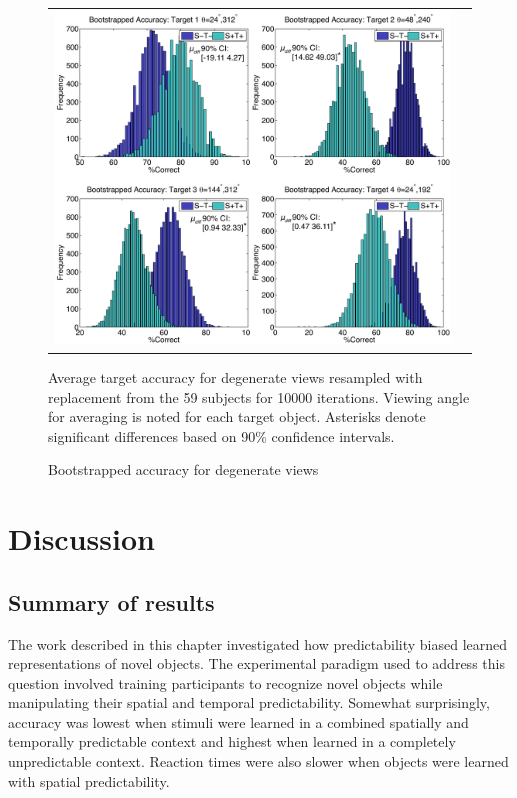 \documentclass[dwyatte_dissertation.tex]{subfiles}
\begin{document}
\begin{figure}[h!]
\begin{center}
\begin{tabular}{ll}
\includegraphics[width=160mm]{figs/chap_bpleast/results_bootstrap_montage.pdf}
\end{tabular}
\end{center}
\caption{Bootstrapped accuracy for degenerate views}{Average target accuracy for degenerate views resampled with replacement from the 59 subjects for 10000 iterations. Viewing angle for averaging is noted for each target object. Asterisks denote significant differences based on 90\% confidence intervals.}
\label{fig:bpleast_behave_bootstrap}
\end{figure}

\section{Discussion}\subsection{Summary of results}
The work described in this chapter investigated how predictability biased learned representations of novel objects. The experimental paradigm used to address this question involved training participants to recognize novel objects while manipulating their spatial and temporal predictability. Somewhat surprisingly, accuracy was lowest when stimuli were learned in a combined spatially and temporally predictable context and highest when learned in a completely unpredictable context. Reaction times were also slower when objects were learned with spatial predictability.
\end{document}
